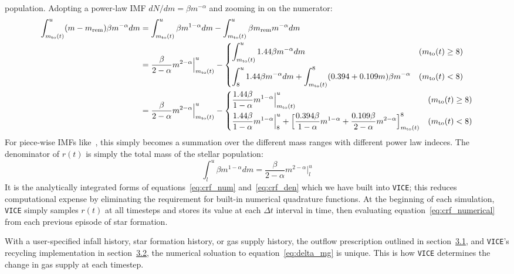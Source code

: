 \documentclass{report}
\begin{document}
population. Adopting a power-law IMF $dN/dm = \beta m^{-\alpha}$ and zooming 
in on the numerator: 
\begin{equation}\begin{split}
\label{eq:crf_num}
\int_{m_\text{to}(t)}^u(m - m_\text{rem})\beta m^{-\alpha} dm &= 
\int_{m_\text{to}(t)}^u \beta m^{1 - \alpha}dm - \int_{m_\text{to}(t)}^u 
\beta m_\text{rem}m^{-\alpha} dm \\ 
&= \frac{\beta}{2 - \alpha} m^{2 - \alpha}\Big|_{m_\text{to}(t)}^u - 
\begin{dcases}
\int_{m_\text{to}(t)}^u 1.44\beta m^{-\alpha} dm & (m_\text{to}(t) \geq 8) \\ 
\int_{8}^u 1.44\beta m^{-\alpha} dm + 
\int_{m_\text{to}(t)}^8 (0.394 + 0.109m)\beta m^{-\alpha} & (m_\text{to}(t) < 8) 
\end{dcases} \\ 
&= \frac{\beta}{2 - \alpha} m^{2 - \alpha}\Big|_{m_\text{to}(t)}^u - 
\begin{dcases} 
\frac{1.44\beta}{1 - \alpha} m^{1 - \alpha}\Big|_{m_\text{to}(t)}^u & 
(m_\text{to}(t) \geq 8) \\ 
\frac{1.44\beta}{1 - \alpha}m^{1 - \alpha}\Big|_8^u + 
\Big[\frac{0.394\beta}{1 - \alpha}m^{1 - \alpha} + \frac{0.109\beta}{2 - 
\alpha}m^{2 - \alpha}\Big]_{m_\text{to}(t)}^8 & (m_\text{to}(t) < 8)
\end{dcases}
\end{split}\end{equation}
For piece-wise IMFs like~\citet{Kroupa2001}, this simply becomes a summation 
over the different mass ranges with different power law indeces. The 
denominator of $r(t)$ is simply the total mass of the stellar population: 
\begin{equation}
\label{eq:crf_den}
\int_l^u\beta m^{1 - \alpha}dm = \frac{\beta}{2 - \alpha}m^{2 - \alpha}
\Big|_l^u 
\end{equation}
It is the analytically integrated forms of equations~\ref{eq:crf_num} 
and~\ref{eq:crf_den} which we have built into \texttt{VICE}; this reduces 
computational expense by eliminating the requirement for built-in numerical 
quadrature functions. At the beginning of each simulation, \texttt{VICE} 
simply samples $r(t)$ at all timesteps and stores its value at each 
$\Delta t$ interval in time, then evaluating equation~\ref{eq:crf_numerical} 
from each previous episode of star formation. 
\par
With a user-specified infall history, star formation history, or gas supply 
history, the outflow prescription outlined in section~\hyperlink{sec:outflows}
{3.1}, and \texttt{VICE}'s recycling implementation in 
section~\hyperlink{sec:recycling}{3.2}, the numerical soluation to 
equation~\ref{eq:delta_mg} is unique. This is how \texttt{VICE} determines the 
change in gas supply at each timestep. 
\end{document}
